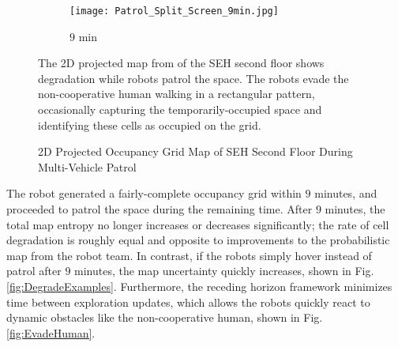 \begin{figure}[!t]
{    	\begin{subfigure}[t]{0.25\columnwidth}
          	\texttt{[image: Patrol\_Split\_Screen\_9min.jpg]}
        		\caption{$9$ min}
    	\end{subfigure}
	}
	\caption{2D Projected Occupancy Grid Map of SEH Second Floor During Multi-Vehicle Patrol}
	\medskip
	\small
	The 2D projected map from of the SEH second floor shows degradation while robots patrol the space. The robots evade the non-cooperative human walking in a rectangular pattern, occasionally capturing the temporarily-occupied space and identifying these cells as occupied on the grid.
	\label{fig:Sim2DMapPatrol}
\end{figure}




The robot generated a fairly-complete occupancy grid within $9$ minutes, and proceeded to patrol the space during the remaining time. After $9$ minutes, the total map entropy no longer increases or decreases significantly; the rate of cell degradation is roughly equal and opposite to improvements to the probabilistic map from the robot team. In contrast, if the robots simply hover instead of patrol after $9$ minutes, the map uncertainty quickly increases, shown in Fig. \ref{fig:DegradeExamples}. Furthermore, the receding horizon framework minimizes time between exploration updates, which allows the robots quickly react to dynamic obstacles like the non-cooperative human, shown in Fig. \ref{fig:EvadeHuman}.

